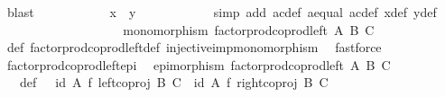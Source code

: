\begin{isabellebody}
\ blast\isanewline
\ \ \ \ \ \ \ \ \isamarkupfalse%
\ \isamarkupfalse%
\ {\isachardoublequoteopen}x\ {\isacharequal}{\kern0pt}\ y{\isachardoublequoteclose}\isanewline
\ \ \ \ \ \ \ \ \ \ \isamarkupfalse%
\ {\isacharparenleft}{\kern0pt}simp\ add{\isacharcolon}{\kern0pt}\ a{\isacharprime}{\kern0pt}c{\isacharprime}{\kern0pt}{\isacharunderscore}{\kern0pt}def\ a{\isacharunderscore}{\kern0pt}equal\ ac{\isacharunderscore}{\kern0pt}def\ x{\isacharprime}{\kern0pt}{\isacharunderscore}{\kern0pt}def\ y{\isacharprime}{\kern0pt}{\isacharunderscore}{\kern0pt}def{\isacharparenright}{\kern0pt}\isanewline
\ \ \ \ \ \ \isamarkupfalse%
\isanewline
\ \ \ \ \isamarkupfalse%
\isanewline
\ \ \isamarkupfalse%
\isanewline
\ \ \isamarkupfalse%
\ \isamarkupfalse%
\ {\isachardoublequoteopen}monomorphism\ {\isacharparenleft}{\kern0pt}factor{\isacharunderscore}{\kern0pt}prod{\isacharunderscore}{\kern0pt}coprod{\isacharunderscore}{\kern0pt}left\ A\ B\ C{\isacharparenright}{\kern0pt}{\isachardoublequoteclose}\isanewline
\ \ \ \ \isamarkupfalse%
\ {\isasymphi}{\isacharunderscore}{\kern0pt}def\ factor{\isacharunderscore}{\kern0pt}prod{\isacharunderscore}{\kern0pt}coprod{\isacharunderscore}{\kern0pt}left{\isacharunderscore}{\kern0pt}def\ injective{\isacharunderscore}{\kern0pt}imp{\isacharunderscore}{\kern0pt}monomorphism\ \isamarkupfalse%
\ fastforce\isanewline
{}\isamarkupfalse%
%
\endisatagproof
{\isafoldproof}%
%
\isadelimproof
\isanewline
%
\endisadelimproof
\isanewline
{}\isamarkupfalse%
\ factor{\isacharunderscore}{\kern0pt}prod{\isacharunderscore}{\kern0pt}coprod{\isacharunderscore}{\kern0pt}left{\isacharunderscore}{\kern0pt}epi{\isacharcolon}{\kern0pt}\isanewline
\ \ {\isachardoublequoteopen}epimorphism\ {\isacharparenleft}{\kern0pt}factor{\isacharunderscore}{\kern0pt}prod{\isacharunderscore}{\kern0pt}coprod{\isacharunderscore}{\kern0pt}left\ A\ B\ C{\isacharparenright}{\kern0pt}{\isachardoublequoteclose}\isanewline
%
\isadelimproof
%
\endisadelimproof
%
\isatagproof
{}\isamarkupfalse%
\ {\isacharminus}{\kern0pt}\isanewline
\ \ \isamarkupfalse%
\ {\isasymphi}\ \ {\isasymphi}{\isacharunderscore}{\kern0pt}def{\isacharcolon}{\kern0pt}\ {\isachardoublequoteopen}{\isasymphi}\ {\isacharequal}{\kern0pt}\ {\isacharparenleft}{\kern0pt}id\ A\ {\isasymtimes}\isactrlsub f\ left{\isacharunderscore}{\kern0pt}coproj\ B\ C{\isacharparenright}{\kern0pt}\ {\isasymamalg}\ {\isacharparenleft}{\kern0pt}id\ A\ {\isasymtimes}\isactrlsub f\ right{\isacharunderscore}{\kern0pt}coproj\ B\ C{\isacharparenright}{\kern0pt}{\isachardoublequoteclose}\ \isanewline

\end{isabellebody}
